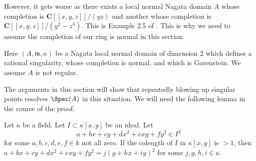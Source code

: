 \medskip\noindent
However, it gets worse as there exists a local normal Nagata domain $A$
whose completion is $\mathbf{C}[[x, y, z]]/(yz)$ and another whose
completion is $\mathbf{C}[[x, y, z]]/(y^2 - z^3)$. This is Example 2.5 of
\cite{Nishimura-few}. This is why we need to assume the completion of
our ring is normal in this section.

\begin{situation}
\label{situation-rational-double-point}
Here $(A, \mathfrak m, \kappa)$ be a Nagata local normal domain of
dimension $2$ which defines a rational singularity, whose completion
is normal, and which is Gorenstein. We assume $A$ is not regular.
\end{situation}

\noindent
The arguments in this section will show that repeatedly blowing
up singular points resolves $\Spec(A)$ in this situation. We will
need the following lemma in the course of the proof.

\begin{lemma}
\label{lemma-issquare}
Let $\kappa$ be a field. Let $I \subset \kappa[x, y]$ be an ideal. Let
$$
a + b x + c y + d x^2 + exy + f y^2 \in I^2
$$
for some $a, b, c, d, e, f \in k$ not all zero. If the colength
of $I$ in $\kappa[x, y]$ is $> 1$, then
$a + b x + c y + d x^2 + exy + f y^2 = j(g + hx + iy)^2$
for some $j, g, h, i \in \kappa$.
\end{lemma}

